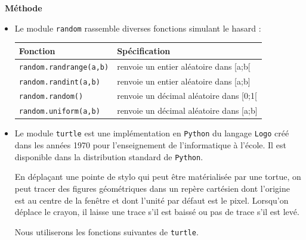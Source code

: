 \documentclass[a4paper, french, 12pt]{article}  %
\newenvironment{methode}[1]
{\par \medskip    \noindent  
 \begin {bclogo}[arrondi =0.1,logo=\bcoutil, marge=4,noborder = true] {~\textbf{Méthode}   {\itshape #1} }  \par}
{
\end{bclogo}
 \par \bigskip }
\begin{document}
 \begin{methode}{}
 
 
 
\begin{itemize}


\item Le module \texttt{random} rassemble diverses fonctions simulant le hasard :

\begin{center}
\begin{tabular}{|l|l|}
\hline 
Fonction & Spécification \\ 
\hline 
\texttt{random.randrange(a,b)} & renvoie un entier aléatoire dans [a;b[ \\ 
\hline 
\texttt{random.randint(a,b)} & renvoie un entier aléatoire dans [a;b] \\ 
\hline 
\texttt{random.random()} & renvoie un décimal aléatoire dans [0;1[ \\ 
\hline 
\texttt{random.uniform(a,b)} & renvoie un décimal aléatoire dans [a;b] \\ 
\hline 
\end{tabular} 


\end{center}


\item Le module \texttt{turtle} est une implémentation en \texttt{Python} du langage \texttt{Logo} créé dans les années 1970 pour l'enseignement de l'informatique à l'école. Il est disponible  dans la distribution standard de \texttt{Python}. 

En déplaçant une pointe de stylo qui peut être matérialisée par une tortue, on peut tracer des figures géométriques dans un repère cartésien dont l'origine est au centre de la fenêtre et dont l'unité par défaut est le pixel.  Lorsqu'on déplace le crayon, il laisse une trace s'il est baissé ou pas de trace s'il est levé.
	
Nous utiliserons les fonctions suivantes de \texttt{turtle}.


\end{itemize}
\end{methode}
\end{document}
